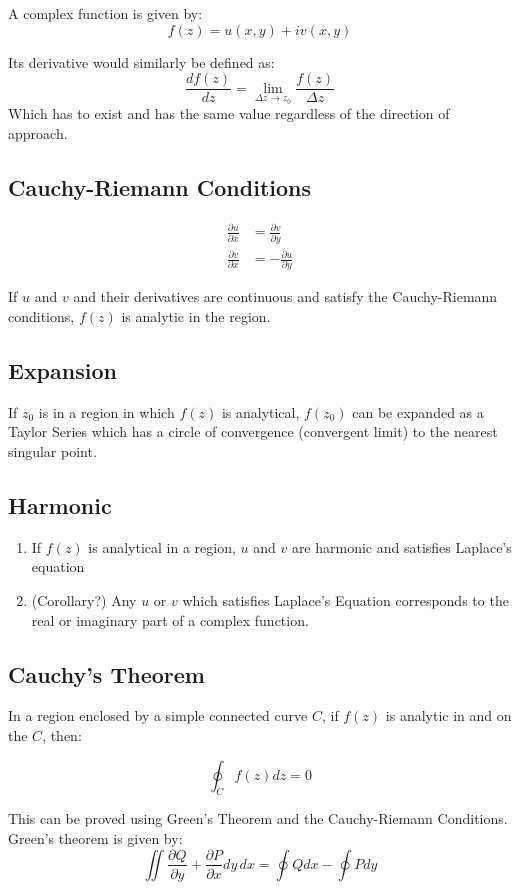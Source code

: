 \documentclass[12pt]{article}
\begin{document}
A complex function is given by:
\[f(z) = u(x,y) + iv(x,y)\]

Its derivative would similarly be defined as:\[ \frac{df(z)}{dz} = \lim_{\Delta z\to z_0}\frac{f(z)}{\Delta z}\]
Which has to exist and has the same value regardless of the direction of approach.



\subsection{Cauchy-Riemann Conditions}
\begin{align*}
    \frac{\partial u}{\partial x} &= \frac{\partial v}{\partial y}\\
    \frac{\partial v}{\partial x} &= -\frac{\partial u}{\partial y}
\end{align*}

If $u$ and $v$ and their derivatives are continuous and satisfy the Cauchy-Riemann conditions, $f(z)$ is analytic in the region. 

\subsection{Expansion}
If $z_0$ is in a region in which $f(z)$ is analytical, $f(z_0)$ can be expanded as a Taylor Series which has a circle of convergence (convergent limit) to the nearest singular point.

\subsection{Harmonic}
\begin{enumerate}
    \item If $f(z)$ is analytical in a region, $u$ and $v$ are harmonic and satisfies Laplace's equation
    \item (Corollary?) Any $u$ or $v$ which satisfies Laplace's Equation corresponds to the real or imaginary part of a complex function. 
\end{enumerate}

\subsection{Cauchy's Theorem}
In a region enclosed by a simple connected curve $C$, if $f(z)$ is analytic in and on the $C$, then:

\[ \oint_C f(z) dz = 0\]

This can be proved using Green's Theorem and the Cauchy-Riemann Conditions. Green's theorem is given by:
\[\iint \frac{\partial Q}{\partial y} + \frac{\partial P}{\partial x} dy\,dx = \oint Qdx - \oint P dy\]
\end{document}
